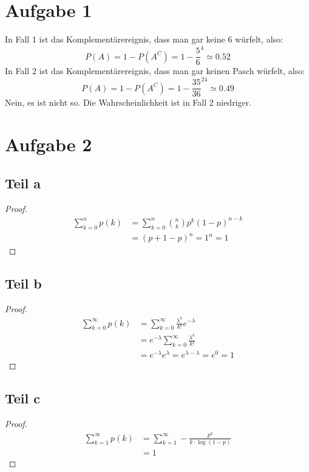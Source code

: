 \documentclass[10pt,a4paper]{article}
\begin{document}
\section{Aufgabe 1}
In Fall 1 ist das Komplementärereignis, dass man gar keine 6 würfelt, also:
\begin{equation}
  P(A) = 1 - P(A^{C}) = 1 - \frac{5}{6}^{4} \simeq 0.52 
\end{equation}
In Fall 2 ist das Komplementärereignis, dass man gar keinen Pasch würfelt, also:
\begin{equation}
  P(A) = 1 - P(A^{C}) = 1 - \frac{35}{36}^{24} \simeq 0.49
\end{equation}
Nein, es ist nicht so.
Die Wahrscheinlichkeit ist in Fall 2 niedriger.

\section{Aufgabe 2}

\subsection{Teil a}
\begin{proof}
  \begin{align*}
    \sum_{k = 0}^{n} p(k) & = \sum_{k = 0}^{n} \binom{n}{k} p^{k} (1 - p)^{n - k}\\
    & = (p + 1 - p)^{n} = 1^{n} = 1
  \end{align*}
\end{proof}

\subsection{Teil b}
\begin{proof}
  \begin{align*}
    \sum_{k = 0}^{\infty} p(k) & = \sum_{k = 0}^{\infty} \frac{\lambda^{k}}{k!} e^{-\lambda}\\
    & = e^{-\lambda} \sum_{k = 0}^{\infty} \frac{\lambda^{k}}{k!}\\
    & = e^{-\lambda} e^{\lambda} = e^{\lambda - \lambda} = e^{0} = 1
  \end{align*}
\end{proof}

\subsection{Teil c}
\begin{proof}
  \begin{align*}
    \sum_{k = 1}^{\infty} p(k) & = \sum_{k = 1}^{\infty} -\frac{p^{k}}{k \cdot \log(1 - p)} \\
    & = 1
  \end{align*}
\end{proof}
\end{document}
